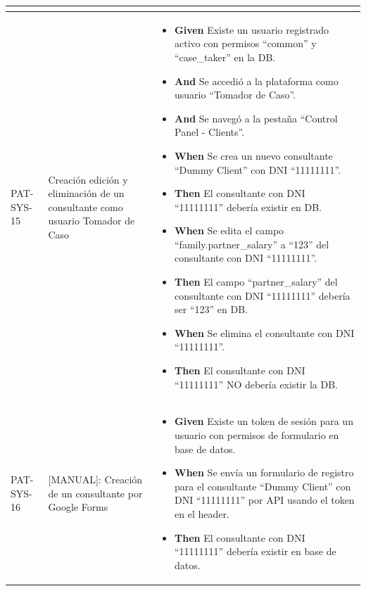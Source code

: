 \begin{longtable}{|p{1cm}|p{2.5cm}|p{12cm}|}
\begin{itemize}
    \end{itemize}
    \\
    \hline
    PAT-SYS-15 & Creación edición y eliminación de un consultante como usuario Tomador de Caso & 
    \begin{itemize}
        \item \textbf{Given} Existe un usuario registrado activo con permisos ``common'' y ``case\_taker'' en la DB.
        \item \textbf{And} Se accedió a la plataforma como usuario ``Tomador de Caso''.
        \item \textbf{And} Se navegó a la pestaña ``Control Panel - Clients''.
        \newline
        \item \textbf{When}  Se crea un nuevo consultante ``Dummy Client'' con DNI ``11111111''.
        \newline
        \item \textbf{Then} El consultante con DNI ``11111111'' deber\'ia existir en DB.
        \newline
        \item \textbf{When} Se edita el campo ``family.partner\_salary'' a ``123'' del consultante con DNI ``11111111''.
        \newline
        \item \textbf{Then} El campo ``partner\_salary'' del consultante con DNI ``11111111'' deber\'ia ser ``123'' en DB.
        \newline
        \item \textbf{When} Se elimina el consultante con DNI ``11111111''.
        \newline
        \item \textbf{Then} El consultante con DNI ``11111111'' NO deber\'ia existir la DB.
    \end{itemize}
    \\
    \hline
    PAT-SYS-16& [MANUAL]: Creación de un consultante por Google Forms & 
    \begin{itemize}
        \item \textbf{Given} Existe un token de sesión para un usuario con permisos de formulario en base de datos.
        \newline
        \item \textbf{When} Se envía un formulario de registro para el consultante ``Dummy Client'' con DNI ``11111111'' por API usando el token en el header.
        \newline
        \item \textbf{Then} El consultante con DNI ``11111111'' debería existir en base de datos.

\end{itemize}
\end{longtable}
